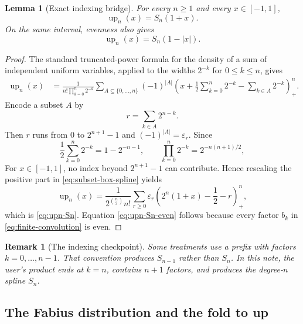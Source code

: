 \documentclass[11pt]{article}
\newtheorem{lemma}[theorem]{Lemma}
\newtheorem{remark}[theorem]{Remark}
\newcommand{\upf}{\operatorname{up}}
\newcommand{\eps}{\varepsilon}
\newcommand{\pospart}[1]{\left(#1\right)_{+}}
\begin{document}
\begin{lemma}[Exact indexing bridge]
\label{lem:indexing-bridge}
For every $n\ge1$ and every $x\in[-1,1]$,
\begin{equation}
 \boxed{\upf_n(x)=S_n(1+x).}
 \label{eq:upn-Sn}
\end{equation}
On the same interval, evenness also gives
\begin{equation}
 \upf_n(x)=S_n(1-|x|).
 \label{eq:upn-Sn-even}
\end{equation}
\end{lemma}

\begin{proof}
The standard truncated-power formula for the density of a sum of independent
uniform variables, applied to the widths $2^{-k}$ for $0\le k\le n$, gives
\begin{align}
 \upf_n(x)
 &=\frac{1}{n!\prod_{k=0}^{n}2^{-k}}
 \sum_{A\subseteq\{0,\ldots,n\}}(-1)^{|A|}
 \pospart{x+\frac12\sum_{k=0}^{n}2^{-k}-\sum_{k\in A}2^{-k}}^n.
 \label{eq:subset-box-spline}
\end{align}
Encode a subset $A$ by
\begin{equation}
 r=\sum_{k\in A}2^{n-k}.
\end{equation}
Then $r$ runs from $0$ to $2^{n+1}-1$ and $(-1)^{|A|}=\eps_r$.  Since
\begin{equation}
 \frac12\sum_{k=0}^{n}2^{-k}=1-2^{-n-1},
 \qquad
 \prod_{k=0}^{n}2^{-k}=2^{-n(n+1)/2},
\end{equation}
For $x\in[-1,1]$, no index beyond $2^{n+1}-1$ can contribute.  Hence
rescaling the positive part in \eqref{eq:subset-box-spline} yields
\begin{equation}
 \upf_n(x)=\frac{1}{2^{\binom n2}n!}
 \sum_{r\ge0}\eps_r
 \pospart{2^n(1+x)-\frac12-r}^{n},
\end{equation}
which is \eqref{eq:upn-Sn}.  Equation \eqref{eq:upn-Sn-even} follows because
every factor $b_k$ in \eqref{eq:finite-convolution} is even.
\end{proof}

\begin{remark}[The indexing checkpoint]
Some treatments use a prefix with factors $k=0,\ldots,n-1$.  That convention
produces $S_{n-1}$ rather than $S_n$.  In this note, the user's product ends at
$k=n$, contains $n+1$ factors, and produces the degree-$n$ spline $S_n$.
\end{remark}

\subsection{The Fabius distribution and the fold to up}
\end{document}
